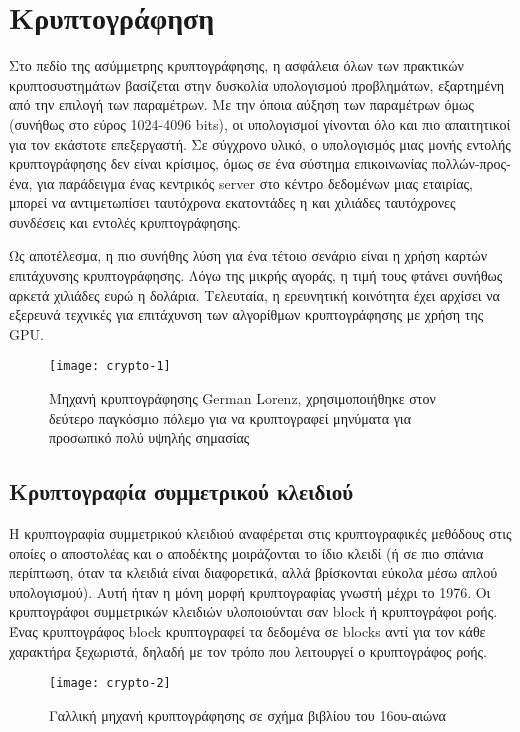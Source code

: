 \section{Κρυπτογράφηση}
Στο πεδίο της ασύμμετρης κρυπτογράφησης, η ασφάλεια όλων των πρακτικών κρυπτοσυστημάτων βασίζεται στην δυσκολία υπολογισμού προβλημάτων, εξαρτημένη από την επιλογή των παραμέτρων. Με την όποια αύξηση των παραμέτρων όμως (συνήθως στο εύρος 1024-4096 bits), οι υπολογισμοί γίνονται όλο και πιο απαιτητικοί για τον εκάστοτε επεξεργαστή. Σε σύγχρονο υλικό, ο υπολογισμός μιας μονής εντολής κρυπτογράφησης δεν είναι κρίσιμος, όμως σε ένα σύστημα επικοινωνίας πολλών-προς-ένα, για παράδειγμα ένας κεντρικός server στο κέντρο δεδομένων μιας εταιρίας, μπορεί να αντιμετωπίσει ταυτόχρονα εκατοντάδες η και χιλιάδες ταυτόχρονες συνδέσεις και εντολές κρυπτογράφησης.

Ως αποτέλεσμα, η πιο συνήθης λύση για ένα τέτοιο σενάριο είναι η χρήση καρτών επιτάχυνσης κρυπτογράφησης. Λόγω της μικρής αγοράς, η τιμή τους φτάνει συνήθως αρκετά χιλιάδες ευρώ η δολάρια.
Τελευταία, η ερευνητική κοινότητα έχει αρχίσει να εξερευνά τεχνικές για επιτάχυνση των αλγορίθμων κρυπτογράφησης με χρήση της GPU. \cite{cryptography-1}

\begin{figure}[h]
\centering
\texttt{[image: crypto-1]}
\caption{Μηχανή κρυπτογράφησης German Lorenz, χρησιμοποιήθηκε στον δεύτερο παγκόσμιο πόλεμο για να κρυπτογραφεί μηνύματα για προσωπικό πολύ υψηλής σημασίας}
\end{figure}

\subsection{Κρυπτογραφία συμμετρικού κλειδιού}
Η κρυπτογραφία συμμετρικού κλειδιού αναφέρεται στις κρυπτογραφικές μεθόδους στις οποίες ο αποστολέας και ο αποδέκτης μοιράζονται το ίδιο κλειδί (ή σε πιο σπάνια περίπτωση, όταν τα κλειδιά είναι διαφορετικά, αλλά βρίσκονται εύκολα μέσω απλού υπολογισμού). Αυτή ήταν η μόνη μορφή κρυπτογραφίας γνωστή μέχρι το 1976.
Οι κρυπτογράφοι συμμετρικών κλειδιών υλοποιούνται σαν block ή κρυπτογράφοι ροής. Ένας κρυπτογράφος block κρυπτογραφεί τα δεδομένα σε blocks αντί για τον κάθε χαρακτήρα ξεχωριστά, δηλαδή με τον τρόπο που λειτουργεί ο κρυπτογράφος ροής.\cite{cryptography-2}


\begin{figure}[h]
\centering
\texttt{[image: crypto-2]}
\caption{Γαλλική μηχανή κρυπτογράφησης σε σχήμα βιβλίου του 16ου-αιώνα}
\end{figure}

